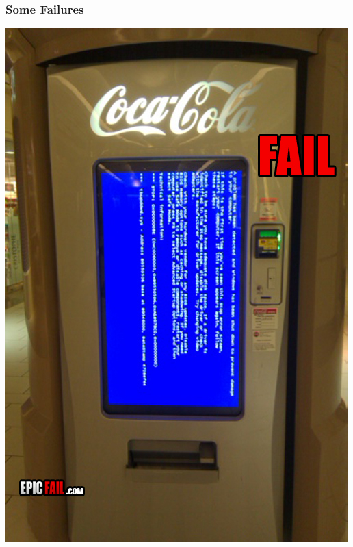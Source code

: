 \documentclass{beamer}
\newenvironment{changemargin}[1]{%
  \begin{list}{}{%
    \setlength{\topsep}{0pt}%
    \setlength{\leftmargin}{#1}%
    \setlength{\rightmargin}{1em}
    \setlength{\listparindent}{\parindent}%
    \setlength{\itemindent}{\parindent}%
    \setlength{\parsep}{\parskip}%
  }%
  \item[]}{\end{list}}
\begin{document}
\begin{frame}
  \frametitle{Some Failures}


  \Large
  \begin{changemargin}{2em}

\begin{center}
\includegraphics[height=.5\textheight]{L01/vending-machine-fail.jpg}~~

\end{center}
\end{changemargin}
\end{frame}
\end{document}
